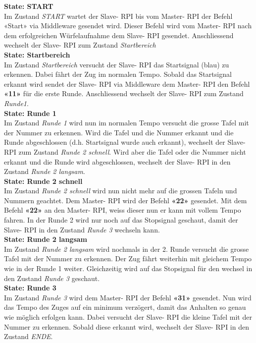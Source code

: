 \documentclass[../../main.tex]{subfiles}
\begin{document}
\newpage

\textbf{State: START}\\
Im Zustand \textit{START} wartet der Slave- RPI bis vom Master- RPI der Befehl «Start» via Middleware gesendet wird. Dieser Befehl wird vom Master- RPI nach dem erfolgreichen Würfelaufnahme dem Slave- RPI gesendet. Anschliessend wechselt der Slave- RPI zum Zustand \textit{Startbereich}\\

\textbf{State: Startbereich}\\
Im Zustand \textit{Startbereich} versucht der Slave- RPI das Startsignal (blau) zu erkennen. Dabei fährt der Zug im normalen Tempo. Sobald das Startsignal erkannt wird sendet der Slave- RPI via Middleware dem Master- RPI den Befehl \textbf{«11»} für die erste Runde. Anschliessend wechselt der Slave- RPI zum Zustand \textit{Runde1}.\\

\textbf{State: Runde 1}\\
Im Zustand \textit{Runde 1} wird nun im normalen Tempo versucht die grosse Tafel mit der Nummer zu erkennen. Wird die Tafel und die Nummer erkannt und die Runde abgeschlossen (d.h. Startsignal wurde auch erkannt), wechselt der Slave- RPI zum Zustand \textit{Runde 2 schnell}. Wird aber die Tafel oder die Nummer nicht erkannt und die Runde wird abgeschlossen, wechselt der Slave- RPI in den Zustand \textit{Runde 2 langsam}.\\

\textbf{State: Runde 2 schnell}\\
Im Zustand \textit{Runde 2 schnell} wird nun nicht mehr auf die grossen Tafeln und Nummern geachtet. Dem Master- RPI wird der Befehl \textbf{«22»} gesendet. Mit dem Befehl \textbf{«22»} an den Master- RPI, weiss dieser nun er kann mit vollem Tempo fahren. In der Runde 2 wird nur noch auf das Stopsignal geschaut, damit der Slave- RPI in den Zustand \textit{Runde 3} wechseln kann.\\

\textbf{State: Runde 2 langsam}\\
Im Zustand \textit{Runde 2 langsam} wird nochmals in der 2. Runde versucht die grosse Tafel mit der Nummer zu erkennen. Der Zug fährt weiterhin mit gleichem Tempo wie in der Runde 1 weiter. Gleichzeitig wird auf das Stopsignal für den wechsel in den Zustand \textit{Runde 3} geschaut.\\

\textbf{State: Runde 3}\\
Im Zustand \textit{Runde 3} wird dem Master- RPI der Befehl \textbf{«31»} gesendet. Nun wird das Tempo des Zuges auf ein minimum verzögert, damit das Anhalten so genau wie möglich erfolgen kann. Dabei versucht der Slave- RPI die kleine Tafel mit der Nummer zu erkennen. Sobald diese erkannt wird, wechselt der Slave- RPI in den Zustand \textit{ENDE}.\\
\end{document}
